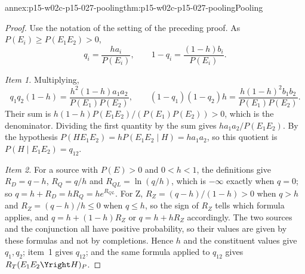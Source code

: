 \begin{annexitem}{annex:p15-w02c-p15-027-pooling}{thm:p15-w02c-p15-027-pooling}{Pooling}
\begin{proof}
Use the notation of the setting of the preceding proof. As
\(P(E_i)\geq P(E_1E_2)>0\),
\[
 q_i=\frac{ha_i}{P(E_i)},\qquad 1-q_i=\frac{(1-h)b_i}{P(E_i)} .
\]

\emph{Item 1.} Multiplying,
\[
 q_1q_2(1-h)=\frac{h^2(1-h)a_1a_2}{P(E_1)P(E_2)},\qquad
 (1-q_1)(1-q_2)h=\frac{h(1-h)^2b_1b_2}{P(E_1)P(E_2)} .
\]
Their sum is \(h(1-h)P(E_1E_2)/(P(E_1)P(E_2))>0\), which is the
denominator. Dividing the first quantity by the sum gives
\(ha_1a_2/P(E_1E_2)\). By the hypothesis
\(P(HE_1E_2)=hP(E_1E_2\mid H)=ha_1a_2\), so this quotient is
\(P(H\mid E_1E_2)=q_{12}\).

\emph{Item 2.} For a source with \(P(E)>0\) and \(0<h<1\), the
definitions give \(R_D=q-h\), \(R_Q=q/h\) and \(R_{QL}=\ln(q/h)\), which
is \(-\infty\) exactly when \(q=0\); so \(q=h+R_D=hR_Q=he^{R_{QL}}\). For
Z, \(R_Z=(q-h)/(1-h)>0\) when \(q>h\) and \(R_Z=(q-h)/h\leq0\) when
\(q\leq h\), so the sign of \(R_Z\) tells which formula applies, and
\(q=h+(1-h)R_Z\) or \(q=h+hR_Z\) accordingly. The two sources and the
conjunction all have positive probability, so their values are given by
these formulas and not by completions. Hence \(h\) and the constituent
values give \(q_1,q_2\); item~1 gives \(q_{12}\); and the same formula
applied to \(q_{12}\) gives \(R_T(E_1E_2\Yright H)_P\).


\end{proof}
\end{annexitem}
